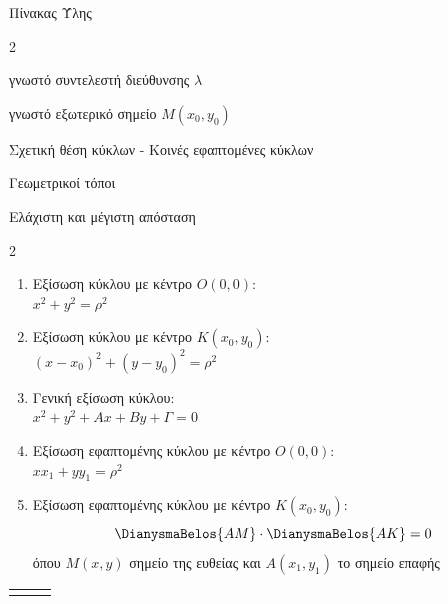 \documentclass[twoside,nofonts,internet,math,spyros]{frontisthrio}
\newcommand{\myplusitem}{\stepcounter{enumi}\item[\raisebox{0.5mm}{\faExclamationTriangle}\ \Large$\square$]}
\begin{document}
\begin{mybox}[mysubtitle]{Πίνακας Ύλης}
\begin{multicols}{2}
\begin{todolist}[itemsep=0mm]
\begin{todolist}[itemsep=0mm,leftmargin=5mm]
\item γνωστό συντελεστή διεύθυνσης $\lambda$
\item γνωστό εξωτερικό σημείο $M(x_0,y_0)$
\end{todolist}
\item Σχετική θέση κύκλων - Κοινές εφαπτομένες κύκλων
\myplusitem Γεωμετρικοί τόποι
\myplusitem Ελάχιστη και μέγιστη απόσταση
\end{todolist}
\end{multicols}
\begin{multicols*}{2}
\begin{enumerate}[itemsep=0mm,leftmargin=5mm]
\item Εξίσωση κύκλου με κέντρο $O(0,0)$:\\ $x^2+y^2=\rho^2$
\item Εξίσωση κύκλου με κέντρο $K(x_0,y_0)$:\\ $(x-x_0)^2+(y-y_0)^2=\rho^2$
\item Γενική εξίσωση κύκλου:\\
$x^2+y^2+Ax+By+\varGamma=0$
\item Εξίσωση εφαπτομένης κύκλου με κέντρο $O(0,0)$:\\
$xx_1+yy_1=\rho^2$
\item Εξίσωση εφαπτομένης κύκλου με κέντρο $K(x_0,y_0)$:
\[\DianysmaBelos{AM}\cdot \DianysmaBelos{AK}=0\] 
όπου $M(x,y)$ σημείο της ευθείας και $A(x_1,y_1)$ το σημείο επαφής 
\end{enumerate}
\end{multicols*}
\begin{center}
\begin{tabular}{p{5cm}cp{5.5cm}}
\begin{tikzpicture}
\begin{axis}[xmin=-2.2,xmax=2.2,ymin=-2.2,ymax=2.2,x=1cm,y=1cm,
ticks=none,xlabel={\footnotesize $ x $},ylabel={\footnotesize $ y $},
aks_on,belh ar]

\end{axis}
\end{tikzpicture}
\end{tabular}
\end{center}
\end{mybox}
\end{document}
